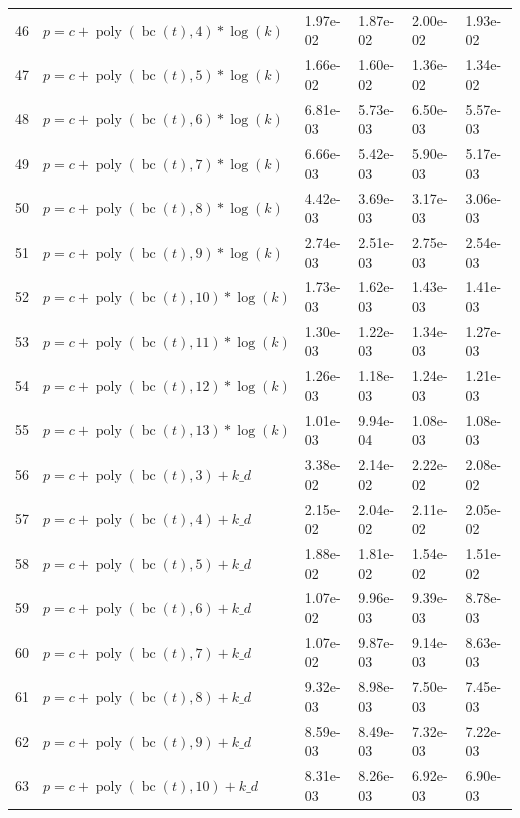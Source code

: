 \documentclass[12pt,a4paper]{article}
\DeclareMathOperator{\bc}{bc}
\DeclareMathOperator{\poly}{poly}
\begin{document}
\begin{longtable}[t]{ll>{\raggedleft\arraybackslash}p{2cm}>{\raggedleft\arraybackslash}p{2cm}>{\raggedleft\arraybackslash}p{2cm}>{\raggedleft\arraybackslash}p{2cm}}
46 & $p = c + \poly\left( \bc(t), 4 \right) * \log(k)$ & 1.97e-02 & 1.87e-02 & 2.00e-02 & 1.93e-02\\
\rowcolor{gray!6}  47 & $p = c + \poly\left( \bc(t), 5 \right) * \log(k)$ & 1.66e-02 & 1.60e-02 & 1.36e-02 & 1.34e-02\\
48 & $p = c + \poly\left( \bc(t), 6 \right) * \log(k)$ & 6.81e-03 & 5.73e-03 & 6.50e-03 & 5.57e-03\\
\rowcolor{gray!6}  49 & $p = c + \poly\left( \bc(t), 7 \right) * \log(k)$ & 6.66e-03 & 5.42e-03 & 5.90e-03 & 5.17e-03\\
50 & $p = c + \poly\left( \bc(t), 8 \right) * \log(k)$ & 4.42e-03 & 3.69e-03 & 3.17e-03 & 3.06e-03\\
\rowcolor{gray!6}  51 & $p = c + \poly\left( \bc(t), 9 \right) * \log(k)$ & 2.74e-03 & 2.51e-03 & 2.75e-03 & 2.54e-03\\
52 & $p = c + \poly\left( \bc(t), 10 \right) * \log(k)$ & 1.73e-03 & 1.62e-03 & 1.43e-03 & 1.41e-03\\
\rowcolor{gray!6}  53 & $p = c + \poly\left( \bc(t), 11 \right) * \log(k)$ & 1.30e-03 & 1.22e-03 & 1.34e-03 & 1.27e-03\\
54 & $p = c + \poly\left( \bc(t), 12 \right) * \log(k)$ & 1.26e-03 & 1.18e-03 & 1.24e-03 & 1.21e-03\\
\rowcolor{gray!6}  55 & $p = c + \poly\left( \bc(t), 13 \right) * \log(k)$ & 1.01e-03 & 9.94e-04 & 1.08e-03 & 1.08e-03\\
56 & $p = c + \poly\left( \bc(t), 3 \right) + k\_d$ & 3.38e-02 & 2.14e-02 & 2.22e-02 & 2.08e-02\\
\rowcolor{gray!6}  57 & $p = c + \poly\left( \bc(t), 4 \right) + k\_d$ & 2.15e-02 & 2.04e-02 & 2.11e-02 & 2.05e-02\\
58 & $p = c + \poly\left( \bc(t), 5 \right) + k\_d$ & 1.88e-02 & 1.81e-02 & 1.54e-02 & 1.51e-02\\
\rowcolor{gray!6}  59 & $p = c + \poly\left( \bc(t), 6 \right) + k\_d$ & 1.07e-02 & 9.96e-03 & 9.39e-03 & 8.78e-03\\
60 & $p = c + \poly\left( \bc(t), 7 \right) + k\_d$ & 1.07e-02 & 9.87e-03 & 9.14e-03 & 8.63e-03\\
\rowcolor{gray!6}  61 & $p = c + \poly\left( \bc(t), 8 \right) + k\_d$ & 9.32e-03 & 8.98e-03 & 7.50e-03 & 7.45e-03\\
62 & $p = c + \poly\left( \bc(t), 9 \right) + k\_d$ & 8.59e-03 & 8.49e-03 & 7.32e-03 & 7.22e-03\\
\rowcolor{gray!6}  63 & $p = c + \poly\left( \bc(t), 10 \right) + k\_d$ & 8.31e-03 & 8.26e-03 & 6.92e-03 & 6.90e-03\\

\end{longtable}
\end{document}
